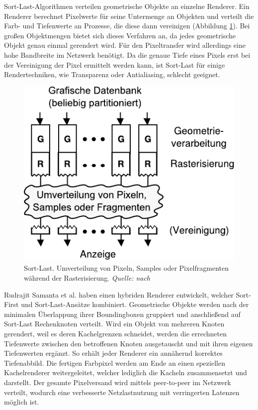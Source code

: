 Sort-Last-Algorithmen verteilen geometrische Objekte an einzelne Renderer. Ein Renderer berechnet Pixelwerte für seine Untermenge an Objekten und verteilt die Farb- und Tiefenwerte an Prozesse, die diese dann vereinigen (Abbildung \ref{fig:relwork:sortlast}). Bei großen Objektmengen bietet sich dieses Verfahren an, da jedes geometrische Objekt genau einmal gerendert wird. Für den Pixeltransfer wird allerdings eine hohe Bandbreite im Netzwerk benötigt. Da die genaue Tiefe eines Pixels erst bei der Vereinigung der Pixel ermittelt werden kann, ist Sort-Last für einige Rendertechniken, wie Transparenz oder Antialiasing, schlecht geeignet.
\begin{figure}
 \centering
  \includegraphics[scale=0.8]{images/sort-last.pdf}
  \caption{Sort-Last. Umverteilung von Pixeln, Samples oder Pixelfragmenten während der Rasterisierung. \textit{Quelle: nach \cite{molnar}}}
 \label{fig:relwork:sortlast}
\end{figure}
Rudrajit Samanta et al. \cite{samanta} haben einen hybriden Renderer entwickelt, welcher Sort-First und Sort-Last-Ansätze kombiniert. Geometrische Objekte werden nach der minimalen Überlappung ihrer Boundingboxen gruppiert und anschließend auf Sort-Last Rechenknoten verteilt. Wird ein Objekt von mehreren Knoten gerendert, weil es deren Kachelgrenzen schneidet, werden die errechneten Tiefenwerte zwischen den betroffenen Knoten ausgetauscht und mit ihren eigenen Tiefenwerten ergänzt. So erhält jeder Renderer ein annähernd korrektes Tiefenabbild. Die fertigen Farbpixel werden am Ende an einen speziellen Kachelrenderer weitergeleitet, welcher lediglich die Kacheln zusammensetzt und darstellt. Der gesamte Pixelversand wird mittels peer-to-peer im Netz\-werk verteilt, wodurch eine verbesserte Netzlastnutzung mit verringerten Latenzen möglich ist.\\
